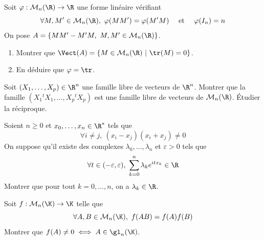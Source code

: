 \begin{exo}
    \label{al1}
    Soit $\varphi : \mathcal M_n(\R)\to \R$ une forme linéaire vérifiant
    \[\forall M,M'\in \mathcal M_n(\R),\ \varphi(MM')=\varphi(M'M)\quad \text{ et }\quad \varphi(I_n)=n\]
    On pose $A=\lbrace MM'-M'M,\ M,M'\in \mathcal M_n(\R)\rbrace$. 
    \begin{enumerate}
        \item Montrer que $\Vect(A)=\lbrace M\in \mathcal M_n(\R)\ |\ \tr(M)=0\rbrace$.
        \item En déduire que $\varphi=\tr$.
    \end{enumerate}
\end{exo}

\begin{exo}
    \label{al2}
	Soit $(X_1,\dots,X_p)\in\R^n$ une famille libre de vecteurs de $\R^n$. Montrer que la famille $(X_1{}^tX_1,\dots,X_p{}^tX_p)$ est une famille libre de vecteurs de $\mathcal M_n(\R)$. Étudier la réciproque.
\end{exo}

\begin{exo}
    \label{al3}
    Soient $n\geq 0$ et $x_0,\dots,x_n\in\R^*$ tels que 
    \[
        \forall i\neq j,\ (x_i-x_j)(x_i+x_j)\neq 0    
    \]
    On suppose qu'il existe des complexes $\lambda_0,\dots,\lambda_n$ et $\varepsilon > 0$ tels que 
    \[
        \forall t\in(-\varepsilon,\varepsilon),\ \sum_{k=0}^n\lambda_ke^{itx_k}\in\R    
    \]
    Montrer que pour tout $k=0,\dots,n$, on a $\lambda_k\in\R$.
\end{exo}

\begin{exo}
    Soit $f:\mathcal M_n(\K)\to \K$ telle que 
    \[
        \forall A,B\in\mathcal M_n(\K),\ f(AB)=f(A)f(B)    
    \]
    Montrer que $f(A)\neq 0\iff A\in\gl_n(\K)$.
\end{exo}
    
